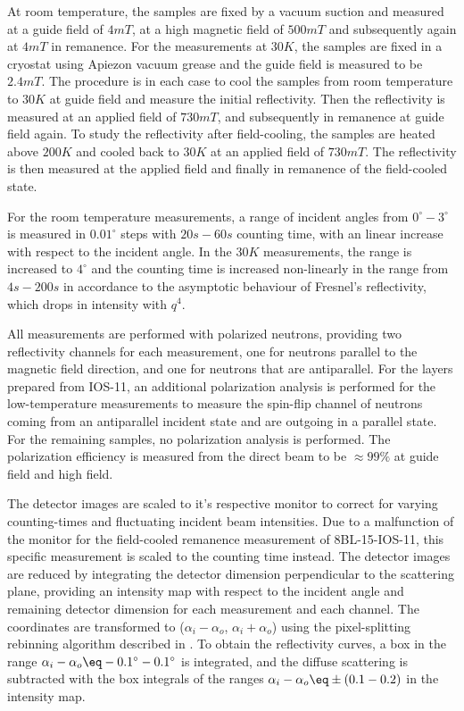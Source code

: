 \documentclass[\main/dresen_thesis.tex]{subfiles}
\begin{document}
    At room temperature, the samples are fixed by a vacuum suction and measured at a guide field of $4 \unit{mT}$, at a high magnetic field of $500 \unit{mT}$ and subsequently again at $4 \unit{mT}$ in remanence.
    For the measurements at $30 \unit{K}$, the samples are fixed in a cryostat using Apiezon vacuum grease and the guide field is measured to be $2.4 \unit{mT}$.
    The procedure is in each case to cool the samples from room temperature to $30 \unit{K}$ at guide field and measure the initial reflectivity.
    Then the reflectivity is measured at an applied field of $730 \unit{mT}$, and subsequently in remanence at guide field again.
    To study the reflectivity after field-cooling, the samples are heated above $200 \unit{K}$ and cooled back to $30 \unit{K}$ at an applied field of $730 \unit{mT}$.
    The reflectivity is then measured at the applied field and finally in remanence of the field-cooled state.

    For the room temperature measurements, a range of incident angles from $0^\circ - 3 ^\circ$ is measured in $0.01 ^\circ$ steps with $20 \unit{s} - 60 \unit{s}$ counting time, with an linear increase with respect to the incident angle.
    In the $30 \unit{K}$ measurements, the range is increased to $4 ^\circ$ and the counting time is increased non-linearly in the range from $4 \unit{s} - 200 \unit{s}$ in accordance to the asymptotic behaviour of Fresnel's reflectivity, which drops in intensity with $q^4$.

    All measurements are performed with polarized neutrons, providing two reflectivity channels for each measurement, one for neutrons parallel to the magnetic field direction, and one for neutrons that are antiparallel.
    For the layers prepared from IOS-11, an additional polarization analysis is performed for the low-temperature measurements to measure the spin-flip channel of neutrons coming from an antiparallel incident state and are outgoing in a parallel state.
    For the remaining samples, no polarization analysis is performed.
    The polarization efficiency is measured from the direct beam to be $\approx 99 \%$ at guide field and high field.

    The detector images are scaled to it's respective monitor to correct for varying counting-times and fluctuating incident beam intensities.
    Due to a malfunction of the monitor for the field-cooled remanence measurement of 8BL-15-IOS-11, this specific measurement is scaled to the counting time instead.
    The detector images are reduced by integrating the detector dimension perpendicular to the scattering plane, providing an intensity map with respect to the incident angle and remaining detector dimension for each measurement and each channel.
    The coordinates are transformed to ($\alpha_i - \alpha_o$, $\alpha_i + \alpha_o$) using the pixel-splitting rebinning algorithm described in .
    To obtain the reflectivity curves, a box in the range $\alpha_i - \alpha_o \eq -0.1 ^\circ - 0.1 ^\circ$ is integrated, and the diffuse scattering is subtracted with the box integrals of the ranges $\alpha_i - \alpha_o \eq \pm (0.1 - 0.2)$ in the intensity map.
\end{document}
